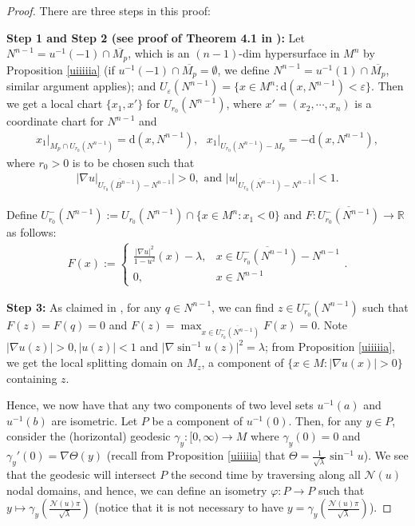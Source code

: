 \documentclass[11pt]{amsart}
\def\d{\mathrm{d}}
\begin{document}
\begin{proof}
    There are three steps in this proof:

    \textbf{Step 1 and Step 2 (see proof of Theorem 4.1 in \cite{xuxue}):} Let $N^{n-1}=u^{-1}(-1)\cap \overline{M_p}$, which is an $(n-1)$-dim hypersurface in $M^n$ by Proposition \ref{uiiiiia} (if $u^{-1}(-1)\cap \overline{M_p}=\emptyset$, we define $N^{n-1}=u^{-1}(1)\cap \overline{M_p}$, similar argument applies); and $U_\varepsilon(N^{n-1})=\{x\in M^n:\d(x,N^{n-1})<\varepsilon\}$. Then we get a local chart $\{x_1,x'\}$ for $U_{r_0}(N^{n-1})$, where $x'=(x_2,\cdots,x_n)$ is a coordinate chart for $N^{n-1}$ and
    \begin{align*}
        x_1\vert_{M_p\cap U_{r_0}(N^{n-1})}=\d(x,N^{n-1}),\text{ }x_1\vert_{U_{r_0}(N^{n-1})-M_p}=-\d(x,N^{n-1}),
    \end{align*}where $r_0>0$ is to be chosen such that
    \begin{align*}
        \vert\nabla u\vert_{\overline{U_{r_0}(B^{n-1})}-N^{n-1}}\vert>0, \text{ and }\vert u\vert_{\overline{U_{r_0}(N^{n-1})}-N^{n-1}}\vert<1.
    \end{align*}

    Define $U_{r_0}^-(N^{n-1}):=U_{r_0}(N^{n-1})\cap \{x\in M^n:x_1<0\}$ and $F:\overline{U_{r_0}^-(N^{n-1})}\to\mathbb{R}$ as follows:
    \begin{align*}
        F(x):=\left\{\begin{array}{ll}
            \frac{\vert\nabla u\vert^2}{1-u^2}(x)-\lambda, & x\in\overline{U_{r_0}^-(N^{n-1})}-N^{n-1}  \\
             0,&x\in N^{n-1} 
        \end{array}\right..
    \end{align*}

    \textbf{Step 3:} As claimed in \cite{xuxue}, for any $q\in N^{n-1}$, we can find $z\in U_{r_0}^-(N^{n-1})$ such that $F(z)=F(q)=0$ and $F(z)=\max_{x\in\overline{U_{r_0}^-(N^{n-1})}}F(x)=0$. Note $\vert\nabla u(z)\vert>0,\vert u(z)\vert<1$ and $\vert\nabla\sin^{-1} u(z)\vert^2=\lambda$; from Proposition \ref{uiiiiia}, we get the local splitting domain on $M_z$, a component of $\{x\in M:\vert\nabla u(x)\vert>0\}$ containing $z$.

    Hence, we now have that any two components of two level sets $u^{-1}(a)$ and $u^{-1}(b)$ are isometric. Let $P$ be a component of $u^{-1}(0)$. Then, for any $y\in P$, consider the (horizontal) geodesic $\gamma_y:[0,\infty)\to M$ where $\gamma_y(0)=0$ and $\gamma_y'(0)=\nabla \Theta(y)$ (recall from Proposition \ref{uiiiiia} that $\Theta=\frac{1}{\sqrt{\lambda}}\sin^{-1}u$). We see that the geodesic will intersect $P$ the second time by traversing along all $\mathcal{N}(u)$ nodal domains, and hence, we can define an isometry $\varphi:P\to P$ such that $y\mapsto \gamma_y\left(\frac{\mathcal{N}(u)\pi}{\sqrt{\lambda}}\right)$ (notice that it is not necessary to have $y=\gamma_y\left(\frac{\mathcal{N}(u)\pi}{\sqrt{\lambda}}\right)$). 


\end{proof}
\end{document}
